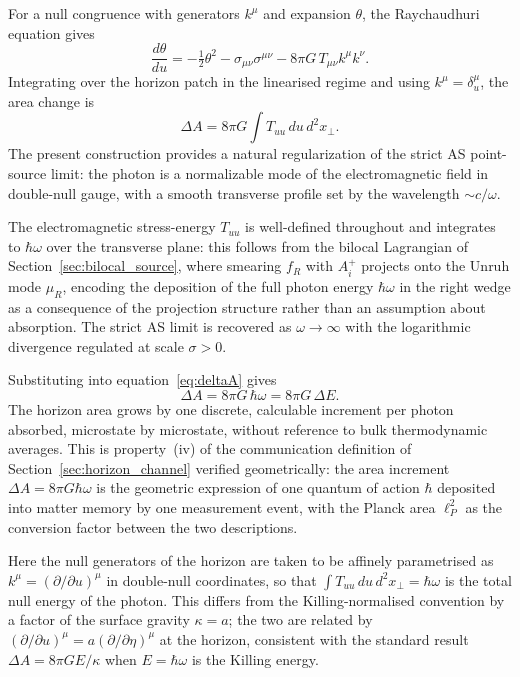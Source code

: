 \documentclass[12pt,a4paper]{article}
\begin{document}
For a null congruence with generators $k^\mu$ and expansion 
$\theta$, the Raychaudhuri equation gives
\begin{equation}
\frac{d\theta}{du} = -\tfrac{1}{2}\theta^2 
    - \sigma_{\mu\nu}\sigma^{\mu\nu} 
    - 8\pi G\, T_{\mu\nu} k^\mu k^\nu.
\end{equation}
Integrating over the horizon patch in the linearised regime 
and using $k^\mu = \delta^\mu_u$, the area change is
\begin{equation}
\Delta A = 8\pi G \int T_{uu}\, du\, d^2x_\perp.
\label{eq:deltaA}
\end{equation}
The present construction provides a natural regularization 
of the strict AS point-source limit: the photon is a 
normalizable mode of the electromagnetic field in 
double-null gauge, with a smooth transverse profile set 
by the wavelength $\sim c/\omega$.


The electromagnetic stress-energy $T_{uu}$ is well-defined 
throughout and integrates to $\hbar\omega$ over the transverse 
plane: this follows from the bilocal Lagrangian of 
Section~\ref{sec:bilocal_source}, where smearing $f_R$ with 
$A_i^+$ projects onto the Unruh mode $\mu_R$, encoding the 
deposition of the full photon energy $\hbar\omega$ in the 
right wedge as a consequence of the projection structure 
rather than an assumption about absorption. The strict AS 
limit is recovered as $\omega \to \infty$ with the 
logarithmic divergence regulated at scale $\sigma > 0$.

Substituting into equation~\eqref{eq:deltaA} gives
\begin{equation}
\boxed{\Delta A = 8\pi G\,\hbar\omega = 8\pi G\,\Delta E.}
\label{eq:deltaA_result}
\end{equation}
The horizon area grows by one discrete, calculable increment 
per photon absorbed, microstate by microstate, without 
reference to bulk thermodynamic averages. This is property~(iv) 
of the communication definition of Section~\ref{sec:horizon_channel} 
verified geometrically: the area increment $\Delta A = 
8\pi G\hbar\omega$ is the geometric expression of one 
quantum of action $\hbar$ deposited into matter memory 
by one measurement event, with the Planck area $\ell_P^2$ 
as the conversion factor between the two descriptions.

Here the null generators of the horizon are taken to be 
affinely parametrised as $k^\mu = (\partial/\partial u)^\mu$ 
in double-null coordinates, so that $\int T_{uu}\,du\,d^2x_\perp 
= \hbar\omega$ is the total null energy of the photon. This 
differs from the Killing-normalised convention by a factor of 
the surface gravity $\kappa = a$; the two are related by 
$(\partial/\partial u)^\mu = a(\partial/\partial\eta)^\mu$ 
at the horizon, consistent with the standard 
result $\Delta A = 8\pi G E/\kappa$ when $E = \hbar\omega$ 
is the Killing energy.
\end{document}
